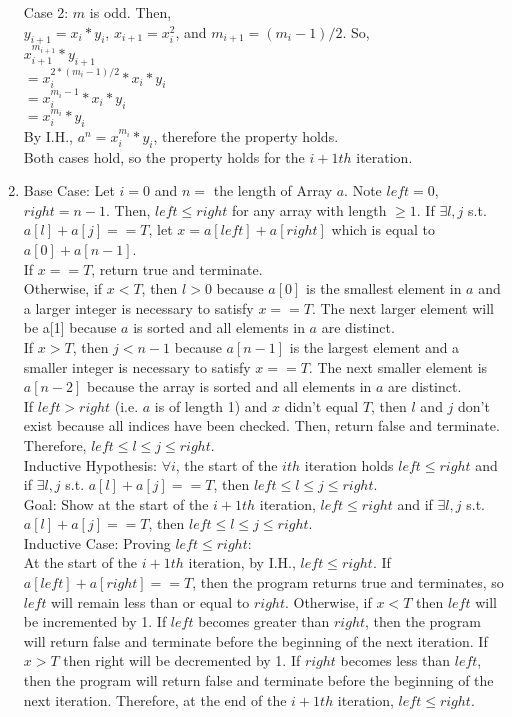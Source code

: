 \documentclass{article}
\begin{document}
\begin{enumerate}
		Case 2: $m$ is odd. Then, \\
		$y_{i+1}=x_i*y_i$, $x_{i+1}=x_i^2$, and  $m_{i+1}=(m_i-1)/2$. So, \\
		$x_{i+1}^{m_{i+1}}*y_{i+1}$\\
		$=x_i^{2*(m_i-1)/2}*x_i*y_i$\\
		$=x_i^{m_i-1}*x_i*y_i$\\
		$=x_i^{m_i}*y_i$\\
		By I.H., $a^n=x^{m_i}_i*y_i$, therefore the property holds.\\
		Both cases hold, so the property holds for the $i+1th$ iteration.\\
		\item Base Case: Let $i=0$ and $n=$ the length of Array $a$. Note $left=0$, $right=n-1$. Then, $left\leq right$ for any array with length $\geq1$. If $\exists l,j$ s.t. $a[l]+a[j]==T$, let $x=a[left]+a[right]$ which is equal to $a[0]+a[n-1]$.\\
		If $x==T$, return true and terminate.\\
		Otherwise, if $x<T$, then $l>0$ because $a[0]$ is the smallest element in $a$ and a larger integer is necessary to satisfy $x==T$. The next larger element will be a[1] because $a$ is sorted and all elements in $a$ are distinct.\\
		If $x>T$, then $j<n-1$ because $a[n-1]$ is the largest element and a smaller integer is necessary to satisfy $x==T$. The next smaller element is $a[n-2]$ because the array is sorted and all elements in $a$ are distinct.\\
		If $left>right$ (i.e. $a$ is of length 1) and $x$ didn't equal $T$, then $l$ and $j$ don't exist because all indices have been checked. Then, return false and terminate.\\
		Therefore, $left\leq l\leq j\leq right$.\\
		Inductive Hypothesis: $\forall i$, the start of the $ith$ iteration holds $left\leq right$ and if $\exists l,j$ s.t. $a[l]+a[j]==T$, then $left\leq l\leq j\leq right$.\\
		Goal: Show at the start of the $i+1th$ iteration, $left \leq right$ and if $\exists l,j$ s.t. $a[l]+a[j]==T$, then $left\leq l\leq j\leq right$.\\ 
		Inductive Case: Proving $left\leq right$:\\
		At the start of the $i+1th$ iteration, by I.H., $left\leq right$. If $a[left]+a[right]==T$, then the program returns true and terminates, so $left$ will remain less than or equal to $right$. Otherwise, if $x<T$ then $left$ will be incremented by 1. If $left$ becomes greater than $right$, then the program will return false and terminate before the beginning of the next iteration. If $x>T$ then right will be decremented by 1. If $right$ becomes less than $left$, then the program will return false and terminate before the beginning of the next iteration. Therefore, at the end of the $i+1th$ iteration, $left\leq right$.\\ 

\end{enumerate}
\end{document}
